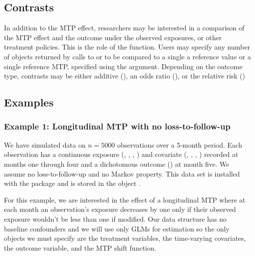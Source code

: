 \documentclass[]{jss}
\begin{document}
\hypertarget{contrasts}{%
\subsection{Contrasts}\label{contrasts}}

In addition to the MTP effect, researchers may be interested in a comparison of the MTP effect
and the outcome under the observed exposures, or other treatment policies. This is the role of the 
function. Users may specify any number of objects returned by calls to  or  to 
be compared to a single a reference value or a single reference MTP, specified using the  argument. 
Depending on the outcome type, contrasts may be either additive (), an odds ratio (), 
or the relative risk ()

\hypertarget{examples}{%
\subsection{Examples}\label{examples}}

\hypertarget{example-1-longitudinal-mtp-with-no-loss-to-follow-up}{%
\subsubsection{Example 1: Longitudinal MTP with no
loss-to-follow-up}\label{example-1-longitudinal-mtp-with-no-loss-to-follow-up}}

We have simulated data on \(n = 5000\) observations over a 5-month
period. Each observation has a continuous exposure (,
, , ) and covariate (,
, , ) recorded at months one through four
and a dichotomous outcome () at month five. We assume no
loss-to-follow-up and no Markov property. This data set is installed
with the package and is stored in the object .

For this example, we are interested in the effect of a longitudinal MTP
where at each month an observation's exposure decreases by one only if
their observed exposure wouldn't be less than one if modified. Our data
structure has no baseline confounders and we will use only GLMs for
estimation so the only objects we must specify are the treatment
variables, the time-varying covariates, the outcome variable, and the
MTP shift function.
\end{document}
